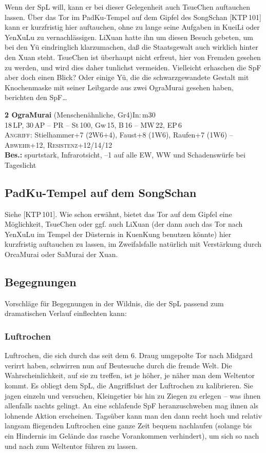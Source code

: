 \documentclass[
a4paper,
twoside,
DIV=calc,
BCOR=4mm,
fontsize=9pt,
twocolumn=on,
titlepage=on,
parskip=half
]{scrartcl}
\begin{document}
Wenn der SpL will, kann er bei dieser Gelegenheit auch TsueChen
auftauchen lassen. Über das Tor im PadKu-Tempel auf dem Gipfel des
SongSchan [KTP\,101] kann er kurzfristig hier auftauchen, ohne zu
lange seine Aufgaben in KueiLi oder YenXuLu zu vernachlässigen. LiXuan
hatte ihn um diesen Besuch gebeten, um bei den Yü eindringlich
klarzumachen, daß die Staatsgewalt auch wirklich hinter den Xuan
steht. TsueChen ist überhaupt nicht erfreut, hier von Fremden gesehen
zu werden, und wird dies daher tunlichst vermeiden. Vielleicht
erhaschen die SpF aber doch einen Blick? Oder einige Yü, die die
schwarzgewandete Gestalt mit Knochenmaske mit seiner Leibgarde aus
zwei OgraMurai gesehen haben, berichten den SpF\dots

\textbf{2 OgraMurai} (Menschenähnliche, Gr4)\hfill In:\,m30\\
18\,LP, 30\,AP -- PR -- St\,100, Gw\,15, B\,16 -- MW\,22, EP\,6\\
\textsc{Angriff:} Stielhammer+7 (2W6+4), Faust+8 (1W6), Raufen+7 (1W6)
-- \textsc{Abwehr}+12,
\textsc{Resistenz}+12/14/12\\
\textbf{Bes.:} spurtstark, Infrarotsicht, --1 auf alle EW, WW und
Schadenswürfe bei Tageslicht

\subsection{PadKu-Tempel auf dem SongSchan}

Siehe [KTP\,101]. Wie schon erwähnt, bietet das Tor auf dem Gipfel
eine Möglichkeit, TsueChen oder ggf. auch LiXuan (der dann auch das
Tor nach YenXuLu im Tempel der Düsternis in KuenKung benutzen könnte)
hier kurzfristig auftauchen zu lassen, im Zweifalsfalle natürlich mit
Verstärkung durch OrcaMurai oder SaMurai der Xuan.

\subsection{Begegnungen}

Vorschläge für Begegnungen in der Wildnis, die der SpL passend zum
dramatischen Verlauf einflechten kann:

\subsubsection{Luftrochen}
\label{begegnung-luftrochen}

Luftrochen, die sich durch das seit dem 6. Draug umgepolte Tor nach
Midgard verirrt haben, schwirren nun auf Beutesuche durch die fremde
Welt. Die Wahrscheinlichkeit, auf sie zu treffen, ist je höher, je
näher man dem Weltentor kommt. Es obliegt dem SpL, die Angriffslust
der Luftrochen zu kalibrieren. Sie jagen einzeln und versuchen,
Kleingetier bis hin zu Ziegen zu erlegen -- was ihnen allenfalls
nachts gelingt. An eine schlafende SpF heranzuschweben mag ihnen als
lohnende Aktion erscheinen. Tagsüber kann man den dann recht hoch und
relativ langsam fliegenden Luftrochen eine ganze Zeit bequem
nachlaufen (solange bis ein Hindernis im Gelände das rasche
Vorankommen verhindert), um sich so nach und nach zum Weltentor führen
zu lassen.
\end{document}
